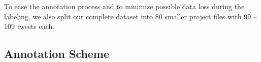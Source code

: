 To ease the annotation process and to minimize possible data loss
during the labeling, we also split our complete dataset into 80
smaller project files with 99 -- 109 tweets each.



\subsection{Annotation Scheme}\label{subsec:snt:ascheme}

